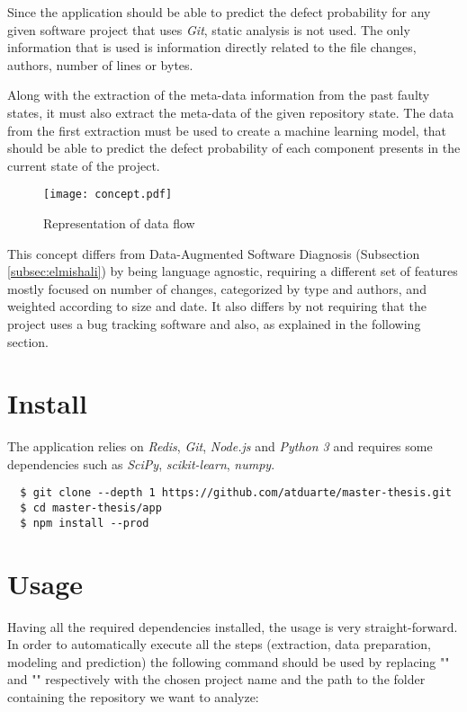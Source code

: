 Since the application should be able to predict the defect probability for any given software project that uses \emph{Git}, static analysis is not used.
The only information that is used is information directly related to the file changes, authors, number of lines or bytes.

Along with the extraction of the meta-data information from the past faulty states, it must also extract the meta-data of the given repository state. The data from the first extraction must be used to create a machine learning model, that should be able to predict the defect probability of each component presents in the current state of the project.
%
\begin{figure}[ht]
  \begin{center}
    \leavevmode
    \texttt{[image: concept.pdf]}
    \caption{Representation of data flow}
    \label{fig:concept}
  \end{center}
\end{figure}

This concept differs from Data-Augmented Software Diagnosis (Subsection \ref{subsec:elmishali}) by being language agnostic, requiring a different set of features mostly focused on number of changes, categorized by type and authors, and weighted according to size and date. It also differs by not requiring that the project uses a bug tracking software and also, as explained in the following section. 

\section{Install}

The application relies on \emph{Redis}, \emph{Git}, \emph{Node.js} and \emph{Python 3} and requires some dependencies such as \emph{SciPy}, \emph{scikit-learn}, \emph{numpy}.

\begin{lstlisting}
  $ git clone --depth 1 https://github.com/atduarte/master-thesis.git
  $ cd master-thesis/app
  $ npm install --prod
\end{lstlisting}

\section{Usage}

Having all the required dependencies installed, the usage is very straight-forward.
In order to automatically execute all the steps (extraction, data preparation, modeling and prediction) the following command should be used
by replacing "" and "" respectively with
the chosen project name and the path to the folder containing the repository we want to analyze:

